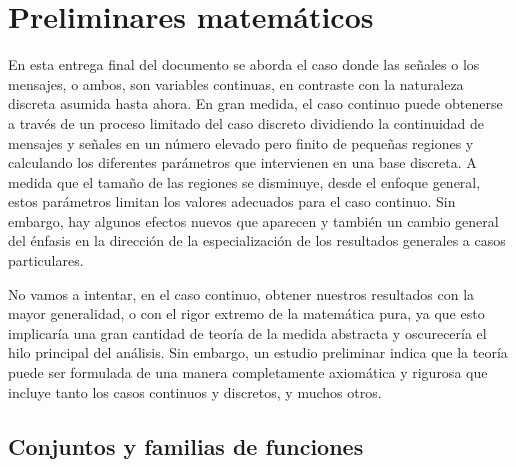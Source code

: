 
\chapter{Preliminares matem\'aticos}

En esta entrega final del documento se aborda el caso donde las
se\~nales o los mensajes, o ambos, son variables continuas, en
contraste con la naturaleza discreta asumida hasta ahora. En gran
medida, el caso continuo puede obtenerse a trav\'es de un proceso
limitado del caso discreto dividiendo la continuidad de mensajes y
se\~nales en un n\'umero elevado pero finito de peque\~nas regiones y
calculando los diferentes par\'ametros que intervienen en una base
discreta. A medida que el tama\~no de las regiones se disminuye, desde
el enfoque general, estos par\'ametros limitan los valores adecuados
para el caso continuo. Sin embargo, hay algunos efectos nuevos que
aparecen y tambi\'en un cambio general del \'enfasis en la direcci\'on
de la especializaci\'on de los resultados generales a casos
particulares.

No vamos a intentar, en el caso continuo, obtener nuestros resultados
con la mayor generalidad, o con el rigor extremo de la matem\'atica
pura, ya que esto implicar\'ia una gran cantidad de teor\'ia de la
medida abstracta y oscurecer\'ia el hilo principal del an\'alisis. Sin
embargo, un estudio preliminar indica que la teor\'ia puede ser
formulada de una manera completamente axiom\'atica y rigurosa que
incluye tanto los casos continuos y discretos, y muchos otros.
\newline

\section{Conjuntos y familias de funciones}

